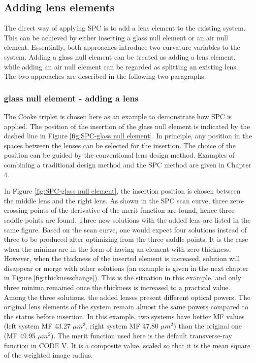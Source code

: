 \subsection{Adding lens elements}
The direct way of applying SPC is to add a lens element to the existing system. This can be achieved by either inserting a glass null element or an air null element. Essentially, both approaches introduce two curvature variables to the system. Adding a glass null element can be treated as adding a lens element, while adding an air null element can be regarded as splitting an existing lens. The two approaches are described in the following two paragraphs.

\subsubsection{glass null element - adding a lens}
The Cooke triplet is chosen here as an example to demonstrate how SPC is applied. 
The position of the insertion of the glass null element is indicated by the dashed line in Figure \ref{fig:SPC-glass null element}. In principle, any position in the spaces between the lenses can be selected for the insertion. The choice of the position can be guided by the conventional lens design method. Examples of combining a traditional design method and the SPC method are given in Chapter 4.

In Figure \ref{fig:SPC-glass null element}, the insertion position is chosen between the middle lens and the right lens. As shown in the SPC scan curve, three zero-crossing points of the derivative of the merit function are found, hence three saddle points are found. Three new solutions with the added lens are listed in the same figure. Based on the scan curve, one would expect four solutions instead of three to be produced after optimizing from the three saddle points. It is the case when the minima are in the form of having an element with zero-thickness. However, when the thickness of the inserted element is increased, solution will disappear or merge with other solutions (an example is given in the next chapter in Figure \ref{fig:thicknesschange}). This is the situation in this example, and only three minima remained once the thickness is increased to a practical value. Among the three solutions, the added lenses present different optical powers. The original lens elements of the system remain almost the same powers compared to the status before insertion. In this example, two systems have better MF values (left system MF 43.27 $\mu m^2$, right system MF 47.80 $\mu m^2$) than the original one (MF 49.95 $\mu m^2$). The merit function used here is the default transverse-ray function in CODE V. It is a composite value, scaled so that it is the mean square of the weighted image radius.

